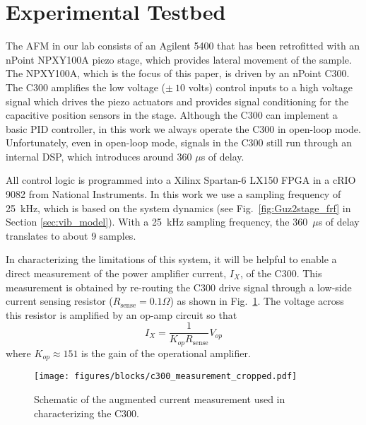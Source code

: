 \documentclass[twocolumn,twoside]{IEEEtran}
\begin{document}
\section{Experimental Testbed}\label{sec:testbed}
The AFM in our lab consists of an Agilent 5400 that has been retrofitted with an nPoint NPXY100A piezo stage, which provides lateral movement of the sample. The NPXY100A, which is the focus of this paper, is driven by an nPoint C300. The C300 amplifies the low voltage ($\pm~10$ volts) control inputs to a high voltage signal which drives the piezo actuators and provides signal conditioning for the capacitive position sensors in the stage. Although the C300 can implement a basic PID controller, in this work we always operate the C300 in open-loop mode. Unfortunately, even in open-loop mode, signals in the C300 still run through an internal DSP, which introduces around 360 $\mu$s of delay. 

All control logic is programmed into a Xilinx Spartan-6 LX150 FPGA in a cRIO 9082 from National Instruments.
In this work we use a sampling frequency of 25~kHz, which is based on the system dynamics (see Fig.~\ref{fig:Guz2stage_frf} in Section \ref{sec:vib_model}). With a 25~kHz sampling frequency, the 360~$\mu$s of delay translates to about 9 samples.

In characterizing the limitations of this system, it will be helpful to enable a direct measurement of the power amplifier current, $I_X$, of the C300. This measurement is obtained by re-routing the C300 drive signal through a low-side current sensing resistor (${R_{\text{sense}}=0.1\Omega}$) as shown in Fig.~\ref{fig:c300_meas}.
The voltage across this resistor is amplified by an op-amp circuit so that
\begin{equation}
I_{X} = \frac{1}{K_{op}R_{\text{sense}}}V_{op}\nonumber
\end{equation}
where $K_{op}\approx 151$ is the gain of the operational amplifier.


\begin{figure}
    \texttt{[image: figures/blocks/c300\_measurement\_cropped.pdf]}
    \caption{Schematic of the augmented current measurement used in characterizing the C300.}
    \label{fig:c300_meas}
\end{figure}
\end{document}
